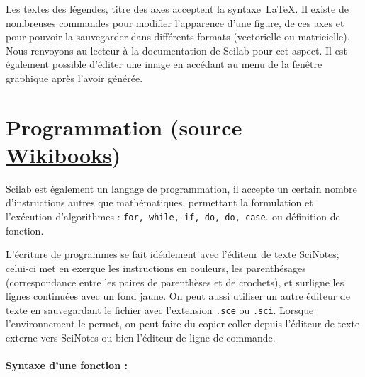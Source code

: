 Les textes des légendes, titre des axes acceptent la syntaxe~\LaTeX.
Il existe de nombreuses commandes pour modifier l'apparence
d'une figure, de ces axes et pour pouvoir la sauvegarder
dans différents formats (vectorielle ou matricielle).
Nous renvoyons au lecteur à la documentation de Scilab pour
cet aspect. Il est également possible d'éditer une image en accédant
au menu de la fenêtre graphique après l'avoir générée.


\section[Programmation]
        {Programmation (source 
        \href{https://fr.wikibooks.org/wiki/Découvrir_Scilab}{Wikibooks}) }

Scilab est également un langage de programmation, il accepte un certain nombre 
d'instructions autres que mathématiques, permettant la formulation et 
l'exécution d'algorithmes : \verb?for, while, if, do, do, case?\ldots ou 
définition de fonction.

L'écriture de programmes se fait idéalement avec l'éditeur de 
texte SciNotes; celui-ci met en exergue les instructions en couleurs, 
les parenthésages (correspondance entre les paires de parenthèses 
et de crochets), et surligne les lignes continuées avec un fond jaune. 
On peut aussi utiliser un autre éditeur de texte en sauvegardant le fichier 
avec l'extension \verb?.sce? ou \verb?.sci?. Lorsque l'environnement le permet,
on peut faire du copier-coller depuis l'éditeur de texte externe vers SciNotes 
ou bien l'éditeur de ligne de commande.

\paragraph{Syntaxe d'une fonction :}

